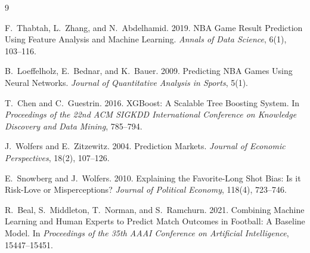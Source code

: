 \documentclass[sigconf]{acmart}
\begin{document}
\begin{thebibliography}{9}

F.~Thabtah, L.~Zhang, and N.~Abdelhamid. 2019. NBA Game Result Prediction Using Feature Analysis and Machine Learning. \textit{Annals of Data Science}, 6(1), 103--116.

B.~Loeffelholz, E.~Bednar, and K.~Bauer. 2009. Predicting NBA Games Using Neural Networks. \textit{Journal of Quantitative Analysis in Sports}, 5(1).

T.~Chen and C.~Guestrin. 2016. XGBoost: A Scalable Tree Boosting System. In \textit{Proceedings of the 22nd ACM SIGKDD International Conference on Knowledge Discovery and Data Mining}, 785--794.

J.~Wolfers and E.~Zitzewitz. 2004. Prediction Markets. \textit{Journal of Economic Perspectives}, 18(2), 107--126.

E.~Snowberg and J.~Wolfers. 2010. Explaining the Favorite-Long Shot Bias: Is it Risk-Love or Misperceptions? \textit{Journal of Political Economy}, 118(4), 723--746.

R.~Beal, S.~Middleton, T.~Norman, and S.~Ramchurn. 2021. Combining Machine Learning and Human Experts to Predict Match Outcomes in Football: A Baseline Model. In \textit{Proceedings of the 35th AAAI Conference on Artificial Intelligence}, 15447--15451.

\end{thebibliography}
\end{document}
